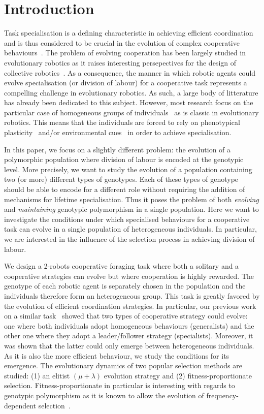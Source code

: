 \section{Introduction}
  Task specialisation is a defining characteristic in achieving efficient coordination and is thus considered to be crucial in the evolution of complex cooperative behaviours~\parencite{Eors1995}. The problem of evolving cooperation has been largely studied in evolutionary robotics as it raises interesting persepectives for the design of collective robotics~\parencite{Trianni2007, Hauert2014, Doncieux2015}. As a consequence, the manner in which robotic agents could evolve specialisation (or division of labour) for a cooperative task represents a compelling challenge in evolutionary robotics. As such, a large body of litterature has already been dedicated to this subject. However, most research focus on the particular case of homogeneous groups of individuals~\parencite{Waibel2009} as is classic in evolutionary robotics. This means that the individuals are forced to rely on phenotypical plasticity~\parencite{Waibel2006, Ferrante2015, Eskridge2015} and/or environmental cues~\parencite{Waibel2006, Goldsby2010} in order to achieve specialisation.

  In this paper, we focus on a slightly different problem: the evolution of a polymorphic population where division of labour is encoded at the genotypic level. More precisely, we want to study the evolution of a population containing two (or more) different types of genotypes. Each of these types of genotype should be able to encode for a different role without requiring the addition of mechanisms for lifetime specialisation. Thus it poses the problem of both \emph{evolving} and \emph{maintaining} genotypic polymorphism in a single population. Here we want to investigate the conditions under which specialised behaviours for a cooperative task can evolve in a single population of heterogeneous individuals. In particular, we are interested in the influence of the selection process in achieving division of labour. 

  We design a 2-robots cooperative foraging task where both a solitary and a cooperative strategies can evolve but where cooperation is highly rewarded. The genotype of each robotic agent is separately chosen in the population and the individuals therefore form an heterogeneous group. This task is greatly favored by the evolution of efficient coordination strategies. In particular, our previous work on a similar task~\parencite{Bernard2015} showed that two types of cooperative strategy could evolve: one where both individuals adopt homogeneous behaviours (generalists) and the other one where they adopt a leader/follower strategy (specialists). Moreover, it was shown that the latter could only emerge between heterogeneous individuals. As it is also the more efficient behaviour, we study the conditions for its emergence. The evolutionary dynamics of two popular selection methods are studied: (1) an elitist \((\mu + \lambda)\) evolution strategy and (2) fitness-proportionate selection. Fitness-proportionate in particular is interesting with regards to genotypic polymorphism as it is known to allow the evolution of frequency-dependent selection~\parencite{Altenberg1991}.

